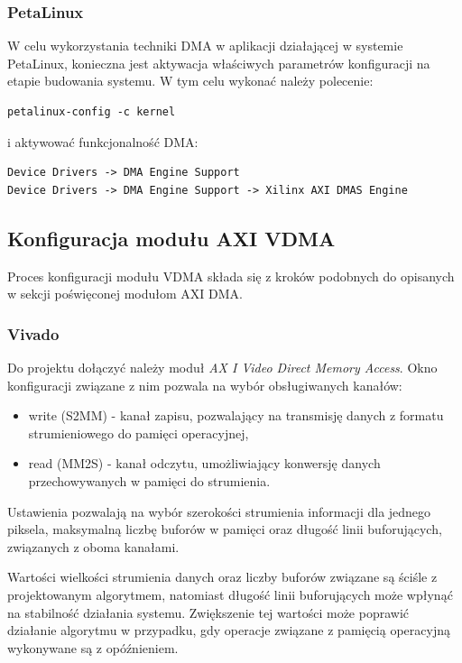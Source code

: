 \subsubsection{PetaLinux}
\label{sec:vivado-axi-dma-petalinux}
W celu wykorzystania techniki DMA w aplikacji działającej w systemie PetaLinux, konieczna jest aktywacja właściwych parametrów konfiguracji na etapie budowania systemu. W tym celu wykonać należy polecenie:

\begin{lstlisting}[breaklines]
petalinux-config -c kernel
\end{lstlisting}

i aktywować funkcjonalność DMA:

\begin{lstlisting}[breaklines]
Device Drivers -> DMA Engine Support
Device Drivers -> DMA Engine Support -> Xilinx AXI DMAS Engine
\end{lstlisting}

\subsection{Konfiguracja modułu AXI VDMA}
\label{sec:vivado-axi-vdma}
Proces konfiguracji modułu VDMA składa się z kroków podobnych do opisanych w sekcji poświęconej modułom AXI DMA.

\subsubsection{Vivado}
Do projektu dołączyć należy moduł \textit{AX I Video Direct Memory Access}. Okno konfiguracji związane z nim pozwala na wybór obsługiwanych kanałów:
\begin{itemize}
	\item write (S2MM) - kanał zapisu, pozwalający na transmisję danych z formatu strumieniowego do pamięci operacyjnej,
	\item read (MM2S) - kanał odczytu, umożliwiający konwersję danych przechowywanych w pamięci do strumienia.
\end{itemize}

Ustawienia pozwalają na wybór szerokości strumienia informacji dla jednego piksela, maksymalną liczbę buforów w pamięci oraz długość linii buforujących, związanych z oboma kanałami.

Wartości wielkości strumienia danych oraz liczby buforów związane są ściśle z projektowanym algorytmem, natomiast długość linii buforujących może wpłynąć na stabilność działania systemu. Zwiększenie tej wartości może poprawić działanie algorytmu w przypadku, gdy operacje związane z pamięcią operacyjną wykonywane są z opóźnieniem.

